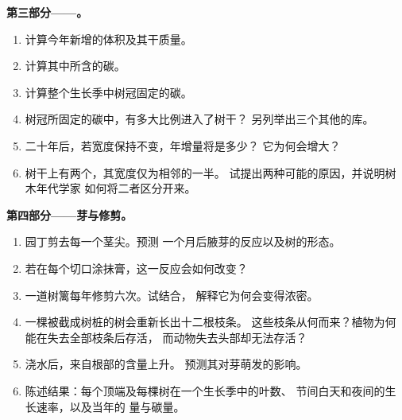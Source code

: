 \begin{problem}
\medskip
\noindent\textbf{第三部分——。}
\begin{enumerate}[resume]
  \item 计算今年新增的体积及其干质量。
  \item 计算其中所含的碳。
  \item 计算整个生长季中树冠固定的碳。
  \item 树冠所固定的碳中，有多大比例进入了树干？
        另列举出三个其他的库。
  \item 二十年后，若宽度保持不变，年增量将是多少？
        它为何会增大？
  \item 树干上有两个，其宽度仅为相邻的一半。
        试提出两种可能的原因，并说明树木年代学家
        如何将二者区分开来。
\end{enumerate}

\medskip
\noindent\textbf{第四部分——芽与修剪。}
\begin{enumerate}[resume]
  \item 园丁剪去每一个茎尖。预测
        一个月后腋芽的反应以及树的形态。
  \item 若在每个切口涂抹膏，这一反应会如何改变？
  \item 一道树篱每年修剪六次。试结合，
        解释它为何会变得浓密。
  \item 一棵被截成树桩的树会重新长出十二根枝条。
        这些枝条从何而来？植物为何能在失去全部枝条后存活，
        而动物失去头部却无法存活？
  \item 浇水后，来自根部的含量上升。
        预测其对芽萌发的影响。
  \item 陈述结果：每个顶端及每棵树在一个生长季中的叶数、
        节间白天和夜间的生长速率，以及当年的
        量与碳量。
\end{enumerate}
\end{problem}
